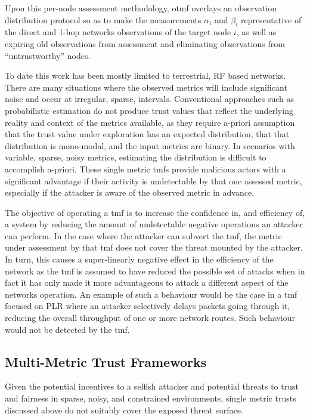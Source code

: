 Upon this per-node assessment methodology, \gls{otmf} overlays an observation distribution protocol so as to make the measurements $\alpha_i$ and $\beta_i$ representative of the direct and 1-hop networks observations of the target node $i$, as well as expiring old observations from assessment and eliminating observations from ``untrustworthy'' nodes.


To date this work has been mostly limited to terrestrial, RF based networks.
There are many situations where the observed metrics will include significant noise and occur at irregular, sparse, intervals.
Conventional approaches such as probabilistic estimation do not produce trust values that reflect the underlying reality and context of the metrics available, as they require a-priori assumption that the trust value under exploration has an expected distribution, that that distribution is mono-modal, and the input metrics are binary.
In scenarios with variable, sparse, noisy metrics, estimating the distribution is difficult to accomplish a-priori.
These single metric \glspl{tmf} provide malicious actors with a significant advantage if their activity is undetectable by that one assessed metric, especially if the attacker is aware of the observed metric in advance.

The objective of operating a \gls{tmf} is to increase the confidence in, and efficiency of, a system by reducing the amount of undetectable negative operations an attacker can perform.
In the case where the attacker can subvert the \gls{tmf}, the metric under assessment by that \gls{tmf} does not cover the threat mounted by the attacker.
In turn, this causes a super-linearly negative effect in the efficiency of the network as the \gls{tmf} is assumed to have reduced the possible set of attacks when in fact it has only made it more advantageous to attack a different aspect of the networks operation.
An example of such a behaviour would be the case in a \gls{tmf} focused on PLR where an attacker selectively delays packets going through it, reducing the overall throughput of one or more network routes.
Such behaviour would not be detected by the \gls{tmf}.

\subsection{Multi-Metric Trust Frameworks}\label{sec:multimetrictrust}
Given the potential incentives to a selfish attacker and potential threats to trust and fairness in sparse, noisy, and constrained environments, single metric trusts discussed above do not suitably cover the exposed threat surface.

